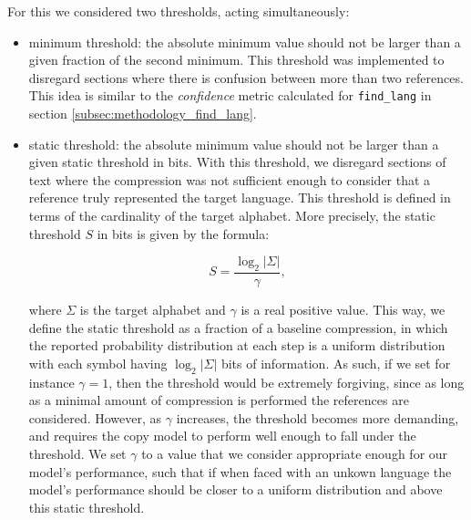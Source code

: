 \documentclass{article}
\begin{document}
For this we considered two thresholds, acting simultaneously:
\begin{itemize}
    \item minimum threshold: the absolute minimum value should not be larger than a given fraction of the second minimum. This threshold was implemented to disregard sections where there is confusion between more than two references. This idea is similar to the \textit{confidence} metric calculated for \texttt{find_lang} in section \ref{subsec:methodology_find_lang}.
    \item static threshold: the absolute minimum value should not be larger than a given static threshold in bits. With this threshold, we disregard sections of text where the compression was not sufficient enough to consider that a reference truly represented the target language.
    This threshold is defined in terms of the cardinality of the target alphabet.
    More precisely, the static threshold $S$ in bits is given by the formula:

    \begin{equation}
        \label{eq:locate_lang_static_threshold}
        S = \frac{\log_2 |\Sigma|}{\gamma},
    \end{equation}

    where $\Sigma$ is the target alphabet and $\gamma$ is a real positive value.
    This way, we define the static threshold as a fraction of a baseline compression, in which the reported probability distribution at each step is a uniform distribution with each symbol having $\log_2 |\Sigma|$ bits of information.
    As such, if we set for instance $\gamma = 1$, then the threshold would be extremely forgiving, since as long as a minimal amount of compression is performed the references are considered.
    However, as $\gamma$ increases, the threshold becomes more demanding, and requires the copy model to perform well enough to fall under the threshold.
    We set $\gamma$ to a value that we consider appropriate enough for our model's performance, such that if when faced with an unkown language the model's performance should be closer to a uniform distribution and above this static threshold.
\end{itemize}
\end{document}
